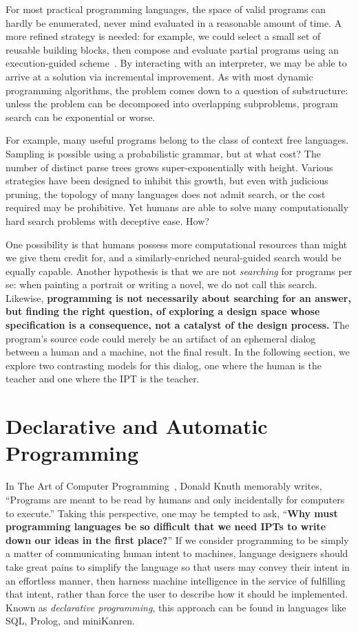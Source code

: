 \documentclass[12pt]{article}
\begin{document}
For most practical programming languages, the space of valid programs can hardly be enumerated, never mind evaluated in a reasonable amount of time. A more refined strategy is needed: for example, we could select a small set of reusable building blocks, then compose and evaluate partial programs using an execution-guided scheme~\cite{chen2018execution, wang2018execution}. By interacting with an interpreter, we may be able to arrive at a solution via incremental improvement. As with most dynamic programming algorithms, the problem comes down to a question of substructure: unless the problem can be decomposed into overlapping subproblems, program search can be exponential or worse.

For example, many useful programs belong to the class of context free languages. Sampling is possible using a probabilistic grammar, but at what cost? The number of distinct parse trees grows super-exponentially with height. Various strategies have been designed to inhibit this growth, but even with judicious pruning, the topology of many languages does not admit search, or the cost required may be prohibitive. Yet humans are able to solve many computationally hard search problems with deceptive ease. How?

One possibility is that humans possess more computational resources than might we give them credit for, and a similarly-enriched neural-guided search would be equally capable. Another hypothesis is that we are not \textit{searching} for programs per se: when painting a portrait or writing a novel, we do not call this search. Likewise, \textbf{programming is not necessarily about searching for an answer, but finding the right question, of exploring a design space whose specification is a consequence, not a catalyst of the design process.} The program's source code could merely be an artifact of an ephemeral dialog between a human and a machine, not the final result. In the following section, we explore two contrasting models for this dialog, one where the human is the teacher and one where the IPT is the teacher.

\section{Declarative and Automatic Programming}\label{sec:automatic-and-declarative-programming}

In The Art of Computer Programming~\cite{knuth1997art}, Donald Knuth memorably writes, ``Programs are meant to be read by humans and only incidentally for computers to execute.'' Taking this perspective, one may be tempted to ask, ``\textbf{Why must programming languages be so difficult that we need IPTs to write down our ideas in the first place?}'' If we consider programming to be simply a matter of communicating human intent to machines, language designers should take great pains to simplify the language so that users may convey their intent in an effortless manner, then harness machine intelligence in the service of fulfilling that intent, rather than force the user to describe how it should be implemented. Known as \textit{declarative programming}, this approach can be found in languages like SQL, Prolog, and miniKanren.
\end{document}
